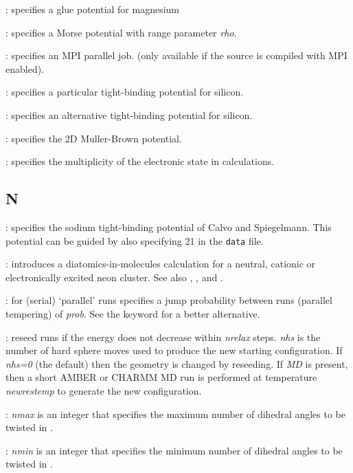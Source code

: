 : specifies a glue potential for magnesium

: specifies a Morse potential 
with range parameter {\it rho\/}.\cite{braierbw90,doyewb95,doyew96a}

: specifies an MPI parallel job.
(only available if the source is compiled with MPI enabled).  

: specifies a particular tight-binding potential for silicon.

: specifies an alternative tight-binding potential for silicon.

: specifies the 2D Muller-Brown potential.

: specifies the multiplicity of the electronic state in {\/}
calculations.

\subsection{N}
: specifies the sodium tight-binding potential of Calvo and Spiegelmann.
This potential can be guided by also specifying { 21} in the {\tt data} file.

: introduces a diatomics-in-molecules calculation for
a neutral, cationic or electronically excited neon cluster. See also
{\/}, {\/}, {\/} and {\/}.

: for (serial)
`parallel' runs specifies a jump probability between runs 
(parallel tempering) of {\it prob\/}.
See the {\/} keyword for a better alternative.

: reseed runs if the energy does not decrease within {\it nrelax} steps.
{\it nhs} is the number of hard sphere moves used to produce the new starting configuration.
If {\it nhs=0} (the default) then the geometry is changed by reseeding. If {\it MD} is present, then a short AMBER or CHARMM MD run is performed at temperature {\it newrestemp} to generate the new configuration.

: {\it nmax\/} is an integer that specifies the maximum number of dihedral angles
to be twisted in {\/}.

: {\it nmin\/} is an integer that specifies the minimum number of dihedral angles
to be twisted in {\/}.

